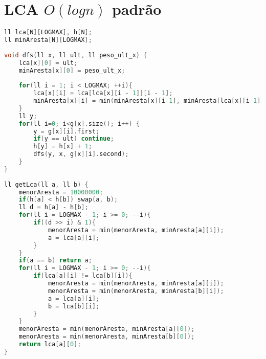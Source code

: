 \documentclass[12pt,a4paper,twoside]{report}
\begin{document}
\section{LCA $O(log n)$ padrão}
\noindent\begin{lstlisting}[caption=LCA log n padrão,language=C++]
ll lca[N][LOGMAX], h[N];
ll minAresta[N][LOGMAX];
 
void dfs(ll x, ll ult, ll peso_ult_x) {
    lca[x][0] = ult;
    minAresta[x][0] = peso_ult_x;
     
    for(ll i = 1; i < LOGMAX; ++i){
        lca[x][i] = lca[lca[x][i - 1]][i - 1];
        minAresta[x][i] = min(minAresta[x][i-1], minAresta[lca[x][i-1]][i-1]);
    }
    ll y;
    for(ll i=0; i<g[x].size(); i++) {
        y = g[x][i].first;
        if(y == ult) continue;
        h[y] = h[x] + 1;
        dfs(y, x, g[x][i].second);
    }
}
 
ll getLca(ll a, ll b) {
    menorAresta = 10000000;
    if(h[a] < h[b]) swap(a, b);
    ll d = h[a] - h[b];
    for(ll i = LOGMAX - 1; i >= 0; --i){
        if((d >> i) & 1){
            menorAresta = min(menorAresta, minAresta[a][i]);
            a = lca[a][i];
        }
    }
    if(a == b) return a;
    for(ll i = LOGMAX - 1; i >= 0; --i){
        if(lca[a][i] != lca[b][i]){
            menorAresta = min(menorAresta, minAresta[a][i]);
            menorAresta = min(menorAresta, minAresta[b][i]);
            a = lca[a][i];
            b = lca[b][i];
        }
    }
    menorAresta = min(menorAresta, minAresta[a][0]);
    menorAresta = min(menorAresta, minAresta[b][0]);
    return lca[a][0];
}
\end{lstlisting}
\end{document}
